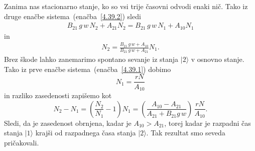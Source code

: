 Zanima nas stacionarno stanje, ko so vsi trije časovni odvodi enaki nič. 
Tako iz druge enačbe sistema~(enačba~\ref{4.39.2}) sledi
\begin{eqnarray}
B_{21}\,g\,w\, N_{2}+A_{21}N_{2} = B_{21}\,g\,w\, N_{1} + A_{10}N_{1} 
\end{eqnarray}
in
\begin{eqnarray}
N_2 = \frac{B_{21}\,g\,w + A_{10}}{B_{21}\,g\,w+A_{21}}N_1.  
\end{eqnarray}
Brez škode lahko zanemarimo spontano sevanje iz stanja
$|2\rangle$ v osnovno stanje. Tako iz prve enačbe sistema~(enačba~\ref{4.39.1}) dobimo
\begin{equation}
N_1= \frac{rN}{A_{10}}
\end{equation}
in razliko zasedenosti zapišemo kot 
\begin{equation}
N_{2}-N_{1}=\left(\frac{N_2}{N_1}-1\right)N_1=\left(\frac{A_{10}-A_{21}}{A_{21}+
B_{21}g\,w}\right)\,\frac{rN}{A_{10}}.
\label{4.42}
\end{equation}
Sledi, da je zasedenost obrnjena, 
kadar je $A_{10}>A_{21}$, torej kadar je
razpadni čas stanja $|1\rangle$ krajši od razpadnega časa stanja $|2\rangle$.
Tak rezultat smo seveda pričakovali.

